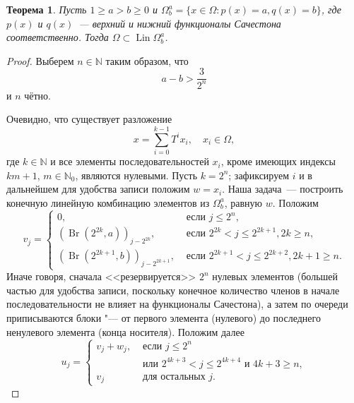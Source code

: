\documentclass[a4paper,14pt]{article} %
\theoremstyle{plain}
\newtheorem{theorem}[lemma]{Теорема}
\begin{document}
\begin{theorem}
	\label{thm:Lin_Omega_Sucheston}
	Пусть
	$1 \geq a > b \geq 0$ и
	$\Omega^a_b = \{x\in\Omega : p(x) = a, q(x) = b\}$,
	где $p(x)$ и $q(x)$~--- верхний и нижний функционалы Сачестона~\cite{sucheston1967banach} соответственно.
	Тогда $\Omega \subset \operatorname{Lin} \Omega^a_b$.
\end{theorem}

\begin{proof}
	Выберем $n\in\mathbb{N}$ таким образом, что
	\begin{equation}
		\label{eq:Omega_a_b_gap}
		a - b > \frac{3}{2^n}
	\end{equation}
	и $n$ чётно.

	Очевидно, что существует разложение
	\begin{equation}
		x = \sum_{i=0}^{k-1} T^i x_i, \quad x_i \in \Omega
		,
	\end{equation}
	где $k\in\mathbb{N}$ и все элементы последовательностей $x_i$,
	кроме имеющих индексы $km+1$, $m\in\mathbb{N}_0$, являются нулевыми.
	Пусть $k=2^n$; зафиксируем $i$ и в дальнейшем для удобства записи положим $w=x_i$.
	Наша задача~--- построить конечную линейную комбинацию элементов из $\Omega^a_b$, равную $w$.
	Положим
	\begin{equation}
		v_j = \begin{cases}
			0,  & \mbox{~если~} j \leq 2^n,
			\\
			(\operatorname{Br}(2^{2k  },a))_{j-2^{2k  }},  & \mbox{~если~} 2^{2k  } < j \leq 2^{2k+1}, 2k   \geq n,
			\\
			(\operatorname{Br}(2^{2k+1},b))_{j-2^{2k+1}},  & \mbox{~если~} 2^{2k+1} < j \leq 2^{2k+2}, 2k+1 \geq n
			.
		\end{cases}
	\end{equation}
	Иначе говоря, сначала <<резервируется>> $2^n$ нулевых элементов
	(большей частью для удобства записи, поскольку конечное количество членов в начале последовательности
	не влияет на функционалы Сачестона),
	а затем по очереди приписываются блоки "--- от первого элемента (нулевого) до последнего ненулевого элемента
	(конца носителя).
	Положим далее
	\begin{equation}
		u_j = \begin{cases}
			v_j + w_j,  & \mbox{~если~} j \leq 2^n
			\\
			            & \mbox{~или~} 2^{4k+3} < j \leq 2^{4k+4} \mbox{~и~} 4k + 3 \geq n,
			\\
			v_j         & \mbox{~для остальных~} j
			.
		\end{cases}
	\end{equation}


\end{proof}
\end{document}

